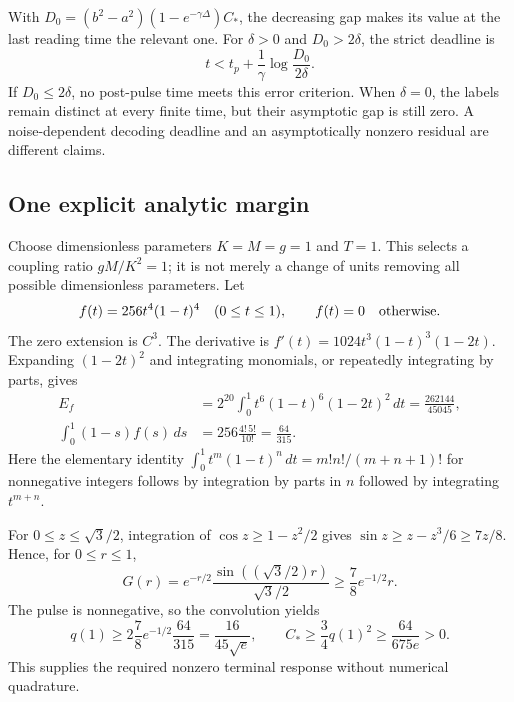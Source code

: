 \documentclass[11pt,a4paper]{article}
\theoremstyle{remark}
\begin{document}
With $D_0=(b^2-a^2)(1-e^{-\gamma\Delta})C_*$, the decreasing gap makes
its value at the last reading time the relevant one. For $\delta>0$
and $D_0>2\delta$, the strict deadline is
\begin{equation}
 t<t_p+\frac1\gamma\log\frac{D_0}{2\delta}.
 \label{eq:deadline}
\end{equation}
If $D_0\le2\delta$, no post-pulse time meets this error criterion.
When $\delta=0$, the labels remain distinct at every finite time, but
their asymptotic gap is still zero. A noise-dependent decoding deadline
and an asymptotically nonzero residual are different claims.

\subsection{One explicit analytic margin}
\label{sec:margin}

Choose dimensionless parameters $K=M=g=1$ and $T=1$. This selects a
coupling ratio $gM/K^2=1$; it is not merely a change of units removing
all possible dimensionless parameters. Let
\begin{equation}
 f(t)=256t^4(1-t)^4\quad(0\le t\le1),\qquad f(t)=0\quad\hbox{otherwise}.
 \label{eq:pulse}
\end{equation}
The zero extension is $C^3$. The derivative is
$f'(t)=1024t^3(1-t)^3(1-2t)$. Expanding $(1-2t)^2$ and integrating
monomials, or repeatedly integrating by parts, gives
\begin{align}
 E_f&=2^{20}\int_0^1t^6(1-t)^6(1-2t)^2\,dt
       =\frac{262144}{45045},\\
 \int_0^1(1-s)f(s)\,ds&=256\frac{4!\,5!}{10!}=\frac{64}{315}.
 \label{eq:pulse-integrals}
\end{align}
Here the elementary identity
$\int_0^1t^m(1-t)^n\,dt=m!n!/(m+n+1)!$ for nonnegative integers
follows by integration by parts in $n$ followed by integrating $t^{m+n}$.

For $0\le z\le\sqrt3/2$, integration of $\cos z\ge1-z^2/2$ gives
$\sin z\ge z-z^3/6\ge7z/8$. Hence, for $0\le r\le1$,
\[
 G(r)=e^{-r/2}\frac{\sin((\sqrt3/2)r)}{\sqrt3/2}
       \ge\frac78e^{-1/2}r.
\]
The pulse is nonnegative, so the convolution yields
\begin{equation}
 q(1)\ge2\frac78e^{-1/2}\frac{64}{315}
       =\frac{16}{45\sqrt e},\qquad
 C_*\ge\frac34q(1)^2\ge\frac{64}{675e}>0.
 \label{eq:c-lower}
\end{equation}
This supplies the required nonzero terminal response without numerical
quadrature.
\end{document}
